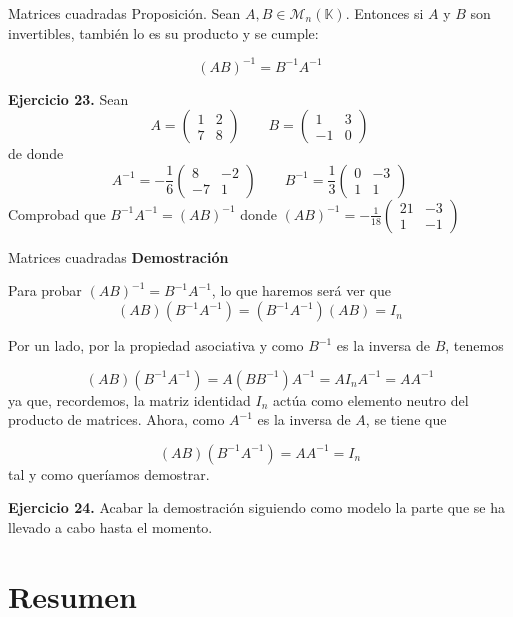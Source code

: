 \documentclass[
  ignorenonframetext,
]{beamer}
\begin{document}
\begin{frame}{Matrices cuadradas}
\protect\hypertarget{matrices-cuadradas-14}{}
Proposición. Sean \(A,B\in\mathcal{M}_n(\mathbb{K})\). Entonces si \(A\)
y \(B\) son invertibles, también lo es su producto y se cumple:

\[(AB)^{-1}=B^{-1}A^{-1}\]

\textbf{Ejercicio 23.} Sean
\[A = \begin{pmatrix}1&2\\7&8\end{pmatrix}\qquad B=\begin{pmatrix}1&3\\-1&0\end{pmatrix}\]
de donde
\[A^{-1} = -\frac{1}{6}\begin{pmatrix}8&-2\\-7&1\end{pmatrix}\qquad B^{-1}=\frac{1}{3}\begin{pmatrix}0&-3\\1&1\end{pmatrix}\]
Comprobad que \(B^{-1}A^{-1}=(AB)^{-1}\) donde
\((AB)^{-1}=-\frac{1}{18}\begin{pmatrix}21&-3\\1&-1\end{pmatrix}\)
\end{frame}

\begin{frame}{Matrices cuadradas}
\protect\hypertarget{matrices-cuadradas-15}{}
\textbf{Demostración}

Para probar \((AB)^{-1}=B^{-1}A^{-1}\), lo que haremos será ver que
\[(AB)(B^{-1}A^{-1}) = (B^{-1}A^{-1})(AB) = I_n\]

Por un lado, por la propiedad asociativa y como \(B^{-1}\) es la inversa
de \(B\), tenemos

\[(AB)(B^{-1}A^{-1}) = A(BB^{-1})A^{-1} = AI_nA^{-1} = AA^{-1}\] ya que,
recordemos, la matriz identidad \(I_n\) actúa como elemento neutro del
producto de matrices. Ahora, como \(A^{-1}\) es la inversa de \(A\), se
tiene que

\[(AB)(B^{-1}A^{-1}) = AA^{-1} = I_n\] tal y como queríamos demostrar.

\textbf{Ejercicio 24.} Acabar la demostración siguiendo como modelo la
parte que se ha llevado a cabo hasta el momento.
\end{frame}

\hypertarget{resumen}{%
\section{Resumen}\label{resumen}}
\end{document}
